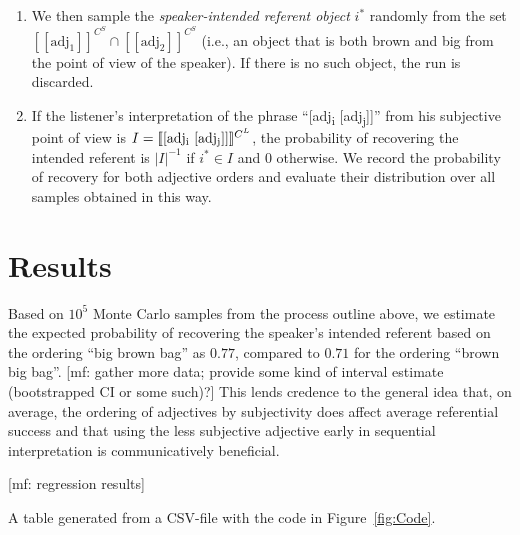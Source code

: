 \documentclass[10pt,a4paper]{article}
\newcommand{\den}[1]{\ensuremath{[\![#1]\!]}}
\newcommand{\mf}[1]{\textcolor{BrickRed}{[mf: #1]}}
\begin{document}
\begin{enumerate}
\item We then sample the \emph{speaker-intended referent object} $i^*$ randomly
  from the set $\den{\text{adj}_1}^{C^S} \cap \den{\text{adj}_2}^{C^S}$ (i.e.,
  an object that is both brown and big from the point of view of the speaker).
  If there is no such object, the run is discarded.
  
\item If the listener's interpretation of the phrase ``[adj\textsubscript{i}
  [adj\textsubscript{j}]]'' from his subjective point of view is $I =
  \den{\text{[adj\textsubscript{i} [adj\textsubscript{j}]]}}^{C^L}$, the
  probability of recovering the intended referent is $|I|^{-1}$ if $i^* \in I$
  and 0 otherwise. We record the probability of recovery for both adjective
  orders and evaluate their distribution over all samples obtained in this way.

\end{enumerate}

\section{Results}

Based on $10^5$ Monte Carlo samples from the process outline above, we estimate the expected probability of recovering the speaker's intended referent based on the ordering ``big brown bag'' as $0.77$, compared to $0.71$ for the ordering ``brown big bag''. \mf{gather more data; provide some kind of interval estimate (bootstrapped CI or some such)?} This lends credence to the general idea that, on average, the ordering of adjectives by subjectivity does affect average referential success and that using the less subjective adjective early in sequential interpretation is communicatively beneficial.

\mf{regression results}

\begin{table}[h]
    \centering


    \caption{A table generated from a CSV-file with the code in Figure~\ref{fig:Code}.}
    \label{tab:RegressionResults}
  \end{table}
\end{document}
